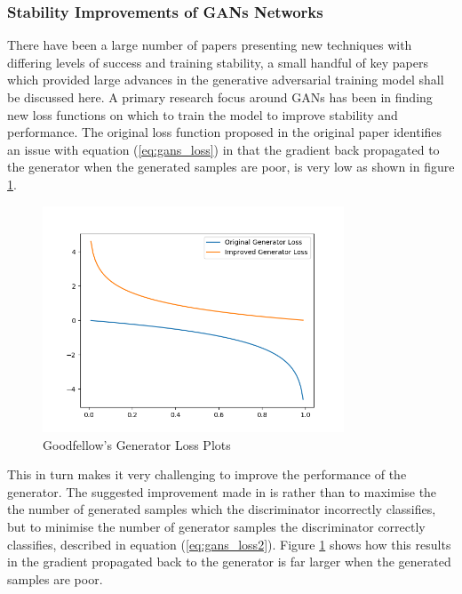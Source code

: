 \documentclass[12pt]{article}
\begin{document}
\subsubsection{Stability Improvements of GANs Networks} \label{Stability_to_GANs}
There have been a large number of papers presenting new techniques with differing levels of success and training stability, a small handful of key papers which provided large advances in the generative adversarial training model shall be discussed here.
A primary research focus around GANs has been in finding new loss functions on which to train the model to improve stability and performance.
The original loss function proposed in the original paper \cite{Goodfellow2014} identifies an issue with equation (\ref{eq:gans_loss}) in that the gradient back propagated to the generator when the generated samples are poor, is very low as shown in figure \ref{fig:Goodfellow_plot}.

\begin{figure}[h]
    \centering
        \includegraphics[width=0.8\textwidth]{../figures/goodfellow_gen_losses.png}
    \caption{Goodfellow's Generator Loss Plots \cite{Goodfellow2014}}\label{fig:Goodfellow_plot}
\end{figure}
\quad

\noindent This in turn makes it very challenging to improve the performance of the generator.
The suggested improvement made in \cite{Goodfellow2014} is rather than to maximise the the number of generated samples which the discriminator incorrectly classifies, but to minimise the number of generator samples the discriminator correctly classifies, described in equation (\ref{eq:gans_loss2}).
Figure \ref{fig:Goodfellow_plot} shows how this results in the gradient propagated back to the generator is far larger when the generated samples are poor.
\end{document}
